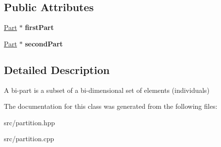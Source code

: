 \subsection*{Public Attributes}
\begin{DoxyCompactItemize}
\item 
\hypertarget{classBiPart_a5846464cf88602318aa6c4f26976255b}{\hyperlink{classPart}{Part} $\ast$ {\bfseries first\-Part}}\label{classBiPart_a5846464cf88602318aa6c4f26976255b}

\item 
\hypertarget{classBiPart_a3497ede9e6226b6b71b39e481d07c63e}{\hyperlink{classPart}{Part} $\ast$ {\bfseries second\-Part}}\label{classBiPart_a3497ede9e6226b6b71b39e481d07c63e}

\end{DoxyCompactItemize}


\subsection{Detailed Description}
A bi-\/part is a subset of a bi-\/dimensional set of elements (individuals) 

The documentation for this class was generated from the following files\-:\begin{DoxyCompactItemize}
\item 
src/partition.\-hpp\item 
src/partition.\-cpp\end{DoxyCompactItemize}
